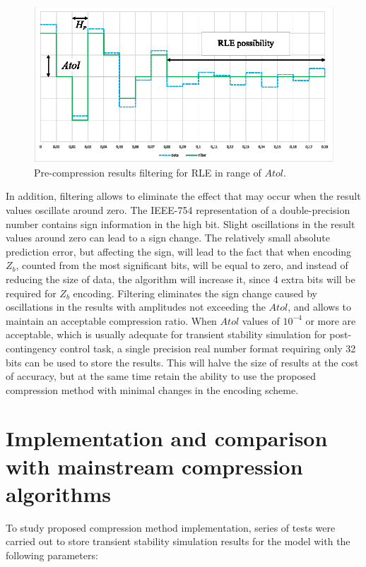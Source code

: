 \documentclass[lettersize,journal]{IEEEtran}
\begin{document}
\begin{figure}[h]
	\centering
	\includegraphics[width=0.8\columnwidth]{fig5.eps}
	\caption{Pre-compression results filtering for RLE in range of \(Atol\).}
	\label{fig_rle}
\end{figure}

In addition, filtering allows to eliminate the effect that may occur when the result values oscillate around zero. 
The IEEE-754 representation of a double-precision number contains sign information in the high bit. 
Slight oscillations in the result values around zero can lead to a sign change. The relatively 
small absolute prediction error, but affecting the sign, will lead to the fact that when encoding \(Z_b\), 
counted from the most significant bits, will be equal to zero, and instead of reducing the size of data, 
the algorithm will increase it, since 4 extra bits will be required for \(Z_b\) encoding. 
Filtering eliminates the sign change caused by oscillations in the results with amplitudes not exceeding 
the \(Atol\), and allows to maintain an acceptable compression ratio.
When \(Atol\) values of \(10^{-4}\) or more are acceptable, which is usually adequate for transient stability
simulation for post-contingency control task, a single precision real number format requiring only 32 bits 
can be used to store the results. 
This will halve the size of results at the cost of accuracy, but at the same time 
retain the ability to use the proposed compression method with minimal changes in the encoding scheme.

\section{Implementation and comparison with mainstream compression algorithms}
To study proposed compression method implementation, series of tests were carried out to store 
transient stability simulation results for the model with the following parameters:
\end{document}
